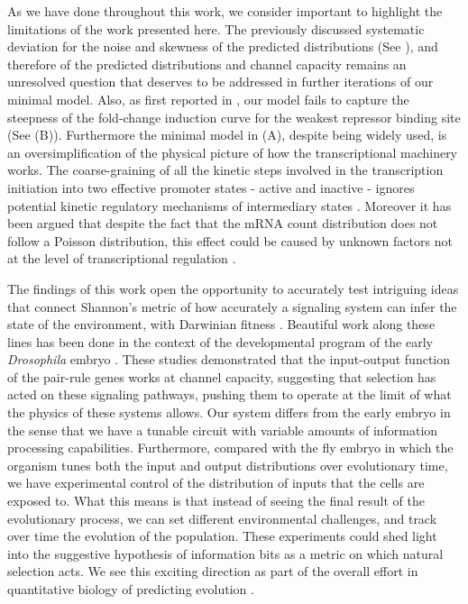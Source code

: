 As we have done throughout this work, we consider important to highlight the
limitations of the work presented here. The previously discussed systematic
deviation for the noise and skewness of the predicted distributions (See
), and therefore of the predicted distributions and
channel capacity remains an unresolved question that deserves to be addressed
in further iterations of our minimal model. Also, as first reported in
\cite{Razo-Mejia2018}, our model fails to capture the steepness of the
fold-change induction curve for the weakest repressor binding site (See
(B)). Furthermore the
minimal model in (A), despite being widely used, is an
oversimplification of the physical picture of how the transcriptional machinery
works. The coarse-graining of all the kinetic steps involved in the
transcription initiation into two effective promoter states - active and
inactive - ignores potential kinetic regulatory mechanisms of intermediary
states \cite{Scholes2017}. Moreover it has been argued that despite the fact
that the mRNA count distribution does not follow a Poisson distribution, this
effect could be caused by unknown factors not at the level of transcriptional
regulation \cite{Choubey2018}.

The findings of this work open the opportunity to accurately test intriguing
ideas that connect Shannon's metric of how accurately a signaling system can
infer the state of the environment, with Darwinian fitness \cite{Taylor2007}.
Beautiful work along these lines has been done in the context of the
developmental program of the early {\it Drosophila} embryo \cite{Tkacik2008,
Petkova2019}. These studies demonstrated that the input-output function of the
pair-rule genes works at channel capacity, suggesting that selection has acted
on these signaling pathways, pushing them to operate at the limit of what the
physics of these systems allows. Our system differs from the early embryo in
the sense that we have a tunable circuit with variable amounts of information
processing capabilities. Furthermore, compared with the fly embryo in which the
organism tunes both the input and output distributions over evolutionary time,
we have experimental control of the distribution of inputs that the cells are
exposed to. What this means is that instead of seeing the final result of the
evolutionary process, we can set different environmental challenges, and track
over time the evolution of the population. These experiments could shed light
into the suggestive hypothesis of information bits as a metric on which natural
selection acts. We see this exciting direction as part of the overall effort in
quantitative biology of predicting evolution \cite{Lassig2017}.